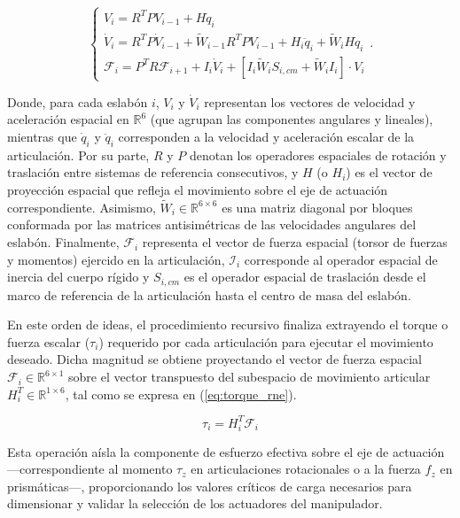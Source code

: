 \documentclass[10pt, letterpaper]{article}
\begin{document}
\begin{equation}
    \label{eq:rne}
    \begin{cases}
    V_i = R^T P V_{i-1} + H \dot{q}_i \\
    \dot{V}_i = R^T P \dot{V}_{i-1} + \tilde{W}_{i-1} R^T P V_{i-1} + H_i \ddot{q}_i + \tilde{W}_i H \dot{q}_i \\
    \mathcal{F}_i = P^T R \mathcal{F}_{i+1} + I_i \dot{V}_i + [I_i \tilde{W}_i S_{i,cm} + \tilde{W}_i I_i] \cdot V_i
    \end{cases}.
\end{equation}

Donde, para cada eslabón $i$, $V_i$ y $\dot{V}_i$ representan los vectores de velocidad y aceleración espacial en $\mathbb{R}^6$ (que agrupan las componentes angulares y lineales), mientras que $\dot{q}_i$ y $\ddot{q}_i$ corresponden a la velocidad y aceleración escalar de la articulación. Por su parte, $R$ y $P$ denotan los operadores espaciales de rotación y traslación entre sistemas de referencia consecutivos, y $H$ (o $H_i$) es el vector de proyección espacial que refleja el movimiento sobre el eje de actuación correspondiente. Asimismo, $\tilde{W}_i \in \mathbb{R}^{6 \times 6}$ es una matriz diagonal por bloques conformada por las matrices antisimétricas de las velocidades angulares del eslabón. Finalmente, $\mathcal{F}_i$ representa el vector de fuerza espacial (torsor de fuerzas y momentos) ejercido en la articulación, $\mathcal{I}_i$ corresponde al operador espacial de inercia del cuerpo rígido y $S_{i,cm}$ es el operador espacial de traslación desde el marco de referencia de la articulación hasta el centro de masa del eslabón.

En este orden de ideas, el procedimiento recursivo finaliza extrayendo el torque o fuerza escalar ($\tau_i$) requerido por cada articulación para ejecutar el movimiento deseado. Dicha magnitud se obtiene proyectando el vector de fuerza espacial $\mathcal{F}_i \in \mathbb{R}^{6 \times 1}$ sobre el vector transpuesto del subespacio de movimiento articular $H_i^T \in \mathbb{R}^{1 \times 6}$, tal como se expresa en (\ref{eq:torque_rne}).

\begin{equation}
\label{eq:torque_rne}
\tau_i = H_i^T \mathcal{F}_i
\end{equation}

Esta operación aísla la componente de esfuerzo efectiva sobre el eje de actuación —correspondiente al momento $\tau_z$ en articulaciones rotacionales o a la fuerza $f_z$ en prismáticas—, proporcionando los valores críticos de carga necesarios para dimensionar y validar la selección de los actuadores del manipulador.
\end{document}
